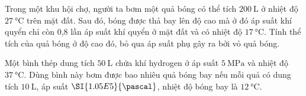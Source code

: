 \begin{ex}
	Trong một khu hội chợ, người ta bơm một quả bóng có thể tích $\SI{200}{\liter}$ ở nhiệt độ $\SI{27}{\celsius}$ trên mặt đất. Sau đó, bóng được thả bay lên độ cao mà ở đó áp suất khí quyển chỉ còn 0,8 lần áp suất khí quyển ở mặt đất và có nhiệt độ $\SI{17}{\celsius}$. Tính thể tích của quả bóng ở độ cao đó, bỏ qua áp suất phụ gây ra bởi vỏ quả bóng.
\end{ex}
\begin{ex}
	Một bình thép dung tích $\SI{50}{\liter}$ chứa khí hydrogen ở áp suất $\SI{5}{\mega\pascal}$ và nhiệt độ $\SI{37}{\celsius}$. Dùng bình này bơm được bao nhiêu quả bóng bay nếu mỗi quả có dung tích $\SI{10}{\liter}$, áp suất $\SI{1.05E5}{\pascal}$, nhiệt độ bóng bay là $\SI{12}{\celsius}$.
	
\end{ex}
